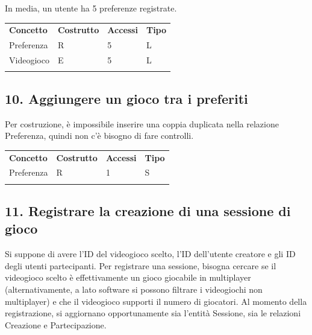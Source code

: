 \documentclass[a4paper,12pt]{report}
\begin{document}
In media, un utente ha 5 preferenze registrate.

\begin{table}[h!]
\begin{center}
	\begin{tabular}{ | m{4cm} P{4cm} P{4cm} P{4cm} | }
	 \textbf{Concetto} & \textbf{Costrutto} & \textbf{Accessi} & \textbf{Tipo} \\
	Preferenza & R & 5 & L \\ \hline
	Videogioco & E & 5 & L \\ \hline
      \\ \hline
	\end{tabular}
\end{center}
\end{table}

\subsection*{10. Aggiungere un gioco tra i preferiti}

Per costruzione, è impossibile inserire una coppia duplicata nella relazione Preferenza, quindi non c'è bisogno di fare controlli.

\begin{table}[h!]
\begin{center}
	\begin{tabular}{ | m{4cm} P{4cm} P{4cm} P{4cm} | }
	 \textbf{Concetto} & \textbf{Costrutto} & \textbf{Accessi} & \textbf{Tipo} \\
	Preferenza & R & 1 & S \\ \hline
      \\ \hline
	\end{tabular}
\end{center}
\end{table}

\subsection*{11. Registrare la creazione di una sessione di gioco}

Si suppone di avere l'ID del videogioco scelto, l'ID dell'utente creatore e gli ID degli utenti partecipanti. Per registrare una sessione, bisogna cercare se il videogioco scelto è effettivamente un gioco giocabile in multiplayer (alternativamente, a lato software si possono filtrare i videogiochi non multiplayer) e che il videogioco supporti il numero di giocatori. Al momento della registrazione, si aggiornano opportunamente sia l'entità Sessione, sia le relazioni Creazione e Partecipazione.
\end{document}
